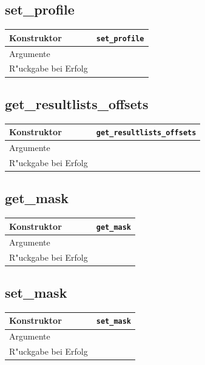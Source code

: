 \documentclass[11pt, twoside, a4paper, BCOR8mm, DIV12, bibtotoc,idxtotoc]{scrbook}
\begin{document}
\subsection{set\_profile}
\begin{shadowenv}
\begin{tabular}{lp{10cm}}
  Konstruktor & \texttt{set\_profile}\\
  \hline
  Argumente     & \\
  R"uckgabe bei Erfolg & \\
\end{tabular}
\end{shadowenv}

\subsection{get\_resultlists\_offsets}
\begin{shadowenv}
\begin{tabular}{lp{10cm}}
  Konstruktor & \texttt{get\_resultlists\_offsets}\\
  \hline
  Argumente     & \\
  R"uckgabe bei Erfolg & \\
\end{tabular}
\end{shadowenv}

\subsection{get\_mask}
\begin{shadowenv}
\begin{tabular}{lp{10cm}}
  Konstruktor & \texttt{get\_mask}\\
  \hline
  Argumente     & \\
  R"uckgabe bei Erfolg & \\
\end{tabular}
\end{shadowenv}

\subsection{set\_mask}
\begin{shadowenv}
\begin{tabular}{lp{10cm}}
  Konstruktor & \texttt{set\_mask}\\
  \hline
  Argumente     & \\
  R"uckgabe bei Erfolg & \\
\end{tabular}
\end{shadowenv}
\end{document}
